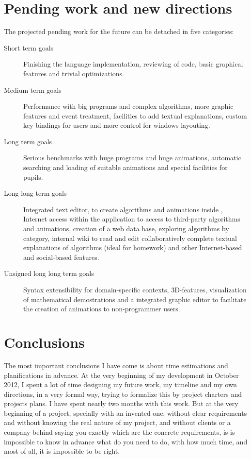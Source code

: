 \documentclass{article}
\begin{document}
\section{Pending work and new directions}
The projected pending work for the future can be detached in five categories:

\begin{description}
  \item[Short term goals] Finishing the language implementation, reviewing of
    code, basic graphical features and trivial optimizations.
  \item[Medium term goals] Performance with big programs and complex algorithms,
    more graphic features and event treatment, facilities to add textual
    explanations, custom key bindings for users and more control for windows
    layouting.
  \item[Long term goals] Serious benchmarks with huge programs and huge
    animations, automatic searching and loading of suitable animations and
    special facilities for pupils.
  \item[Long long term goals] Integrated text editor, to create algorithms and
    animations inside \fav, Internet access within the application to access to
    third-party algorithms and animations, creation of a web data base,
    exploring algorithms by category, internal wiki to read and edit
    collaboratively complete textual explanations of algorithms (ideal for
    homework) and other Internet-based and social-based features.
  \item[Unsigned long long term goals] Syntax extensibility for domain-specific
    contexts, 3D-features, visualization of mathematical demostrations and a
    integrated graphic editor to facilitate the creation of animations to
    non-programmer users.
\end{description}

\section{Conclusions}
The most important conclusions I have come is about time estimations and
planifications in advance. At the very beginning of my development in October
2012, I spent a lot of time designing my future work, my timeline and my own
directions, in a very formal way, trying to formalize this by project charters
and projects plans. I have spent nearly two months with this work. But at the
very beginning of a project, specially with an invented one, without clear
requirements and without knowing the real nature of my project, and without
clients or a company behind saying you exactly which are the concrete
requirements, is is impossible to know in advance what do you need to do, with
how much time, and most of all, it is impossible to be right.
\end{document}
